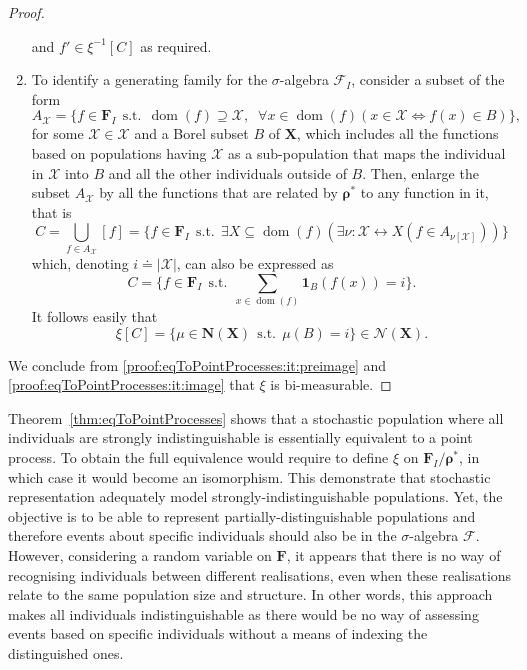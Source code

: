 \documentclass{aptpub}
\numberwithin{equation}{section}
\begin{document}
\begin{proof}
\begin{enumerate}[label=\roman*.]
{\begin{equation*}
{}\end{equation*}}
and $f' \in \xi^{-1}[C]$ as required.
\item \label{proof:eqToPointProcesses:it:image} To identify a generating family for the $\sigma$-algebra ${\mathcal{F}}_I$, consider a subset of the form
{\begin{equation*}{
A_{\mathcal{X}} = \{ f \in {\mathbf{F}}_I {\;\,\mbox{s.t.}\;\,} \operatorname{dom}(f) \supseteq {\mathcal{X}} {,\;\;} \forall x \in \operatorname{dom}(f) (x \in {\mathcal{X}} {\Leftrightarrow} f(x) \in B) \},
}\end{equation*}}
for some ${\mathcal{X}} \in {\boldsymbol{\mathcal{X}}}$ and a Borel subset $B$ of ${\mathbf{X}}$, which includes all the functions based on populations having ${\mathcal{X}}$ as a sub-population that maps the individual in ${\mathcal{X}}$ into $B$ and all the other individuals outside of $B$. Then, enlarge the subset $A_{\mathcal{X}}$ by all the functions that are related by ${\boldsymbol{\rho}}^*$ to any function in it, that is
{\begin{equation*}{
C = \bigcup_{f \in A_{\mathcal{X}}} [f] = \{ f \in {\mathbf{F}}_I {\;\,\mbox{s.t.}\;\,} \exists X \subseteq \operatorname{dom}(f) ( \exists \nu : {\mathcal{X}} {\leftrightarrow} X ( f \in A_{\nu[{\mathcal{X}}]} ))\}
}\end{equation*}}
which, denoting $i {\doteq} |{\mathcal{X}}|$, can also be expressed as
{\begin{equation*}{
C = \bigg\{ f \in {\mathbf{F}}_I {\;\,\mbox{s.t.}\;\,} \sum_{x \in \operatorname{dom}(f)} {{\mathbf{1}}_{{B}}}(f(x)) = i \bigg\}.
}\end{equation*}}
It follows easily that
{\begin{equation*}{
\xi[C] = \{ \mu \in {\mathbf{N}}({\mathbf{X}}) {\;\,\mbox{s.t.}\;\,} \mu(B) = i \} \in {\mathcal{N}}({\mathbf{X}}).
}\end{equation*}}
\end{enumerate}
We conclude from \ref{proof:eqToPointProcesses:it:preimage} and \ref{proof:eqToPointProcesses:it:image} that $\xi$ is bi-measurable.
\end{proof}

Theorem~\ref{thm:eqToPointProcesses} shows that a stochastic population where all individuals are strongly indistinguishable is essentially equivalent to a point process. To obtain the full equivalence would require to define $\xi$ on ${\mathbf{F}}_I/{\boldsymbol{\rho}}^*$, in which case it would become an isomorphism. This demonstrate that stochastic representation adequately model strongly-indistinguishable populations. Yet, the objective is to be able to represent partially-distinguishable populations and therefore events about specific individuals should also be in the $\sigma$-algebra ${\mathcal{F}}$. However, considering a random variable on ${\mathbf{F}}$, it appears that there is no way of recognising individuals between different realisations, even when these realisations relate to the same population size and structure. In other words, this approach makes all individuals indistinguishable as there would be no way of assessing events based on specific individuals without a means of indexing the distinguished ones.
\end{document}
